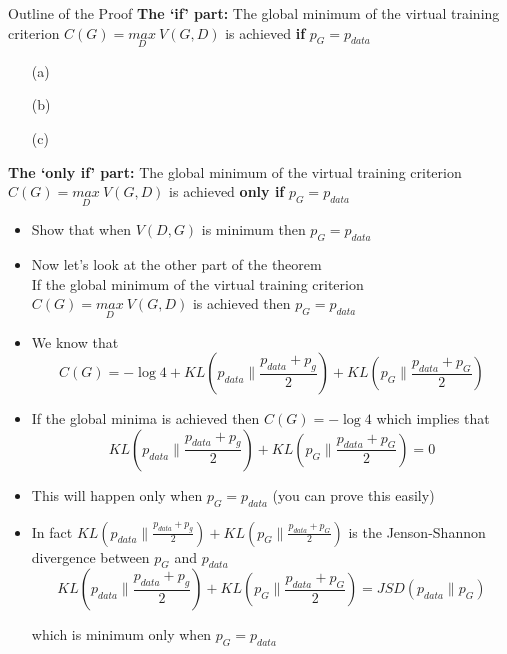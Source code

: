 \begin{frame}
	\begin{block}{Outline of the Proof}
	\textbf{The `if' part:} The global minimum of the virtual training criterion $C(G)=\underset{D}{max} ~V(G,D)$ is achieved \textbf{if} $p_G=p_{data}$
		\begin{enumerate}
			\item[(a)]  \color{black}
			\item[(b)]  \color{black}
			\item[(c)]  \color{black}
		\end{enumerate}
	\vspace{5mm}
	\textbf{The `only if' part:} The global minimum of the virtual training criterion $C(G)=\underset{D}{max} ~V(G,D)$ is achieved \textbf{only if} $p_G=p_{data}$
	\begin{itemize}
		\item \alert<2>{Show that when $V(D,G)$ is minimum then $p_G=p_{data}$}
	\end{itemize}
	\end{block}
\end{frame}

\begin{frame}[shrink=15]
	\begin{itemize}[<+->]
		\item Now let's look at the other part of the theorem\\
			If the global minimum of the virtual training criterion $C(G)=\underset{D}{max}~V(G,D)$ is achieved then $p_G=p_{data}$
		\item We know that
				$$C(G)=-\log 4 + KL\left(p_{data}\|\frac{p_{data}+p_{g}}{2}\right)+KL\left(p_G\|\frac{p_{data}+p_G}{2}\right)$$
		\item If the global minima is achieved then $C(G) = -\log 4$ which implies that 
				$$ KL\left(p_{data}\|\frac{p_{data}+p_{g}}{2}\right)+KL\left(p_G\|\frac{p_{data}+p_G}{2}\right) = 0 $$
		\item This will happen only when $p_G = p_{data}$ (you can prove this easily)
		\item In fact $KL\left(p_{data}\|\frac{p_{data}+p_{g}}{2}\right)+KL\left(p_G\|\frac{p_{data}+p_G}{2}\right)$ is the Jenson-Shannon divergence between $p_G$ and $p_{data}$ 
				$$KL\left(p_{data}\|\frac{p_{data}+p_{g}}{2}\right)+KL\left(p_G\|\frac{p_{data}+p_G}{2}\right) = JSD(p_{data} \| p_G)$$
		\item[] which is minimum only when $p_G = p_{data}$
	\end{itemize}
\end{frame}